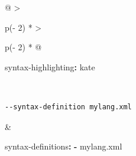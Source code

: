 \documentclass[
]{article}
\newenvironment{Shaded}{}{}
\newcommand{\AttributeTok}[1]{\textcolor[rgb]{0.49,0.56,0.16}{#1}}
\newcommand{\FunctionTok}[1]{\textcolor[rgb]{0.02,0.16,0.49}{#1}}
\newcommand{\KeywordTok}[1]{\textcolor[rgb]{0.00,0.44,0.13}{\textbf{#1}}}
\begin{document}
\begin{longtable}[]{@{}
  >{\raggedright\arraybackslash}p{(\columnwidth - 2\tabcolsep) * }
  >{\raggedright\arraybackslash}p{(\columnwidth - 2\tabcolsep) * }@{}}
\begin{minipage}[t]{\linewidth}
\begin{Shaded}
\begin{Highlighting}[]
\FunctionTok{syntax{-}highlighting}\KeywordTok{:}\AttributeTok{ kate}
\end{Highlighting}
\end{Shaded}
\end{minipage} \\
\begin{minipage}[t]{\linewidth}\raggedright
\begin{verbatim}
--syntax-definition mylang.xml
\end{verbatim}
\end{minipage} & \begin{minipage}[t]{\linewidth}\raggedright
\begin{Shaded}
\begin{Highlighting}[]
\FunctionTok{syntax{-}definitions}\KeywordTok{:}
\AttributeTok{  }\KeywordTok{{-}}\AttributeTok{ mylang.xml}
\end{Highlighting}
\end{Shaded}


\end{minipage}
\end{longtable}
\end{document}
